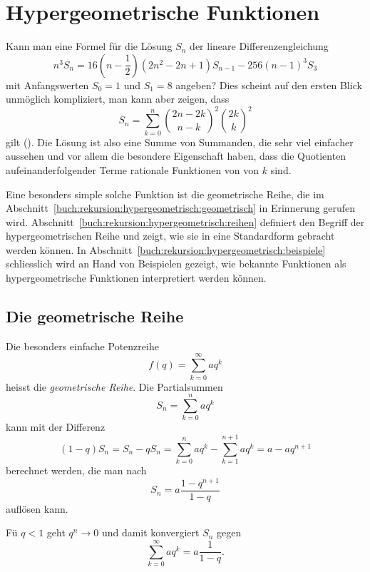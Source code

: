 %
%
%
\section{Hypergeometrische Funktionen
\label{buch:rekursion:ssection:hypergeometrische-funktion}}
Kann man eine Formel für die Lösung $S_n$ der lineare Differenzengleichung
\[
n^3S_{n}
=
16(n-{\textstyle\frac12})(2n^2-2n+1)S_{n-1}
-256(n-1)^3S_3
\]
mit Anfangswerten $S_0=1$ und $S_1=8$ angeben?
Dies scheint auf den ersten Blick unmöglich kompliziert, man kann aber
zeigen, dass
\[
S_n
=
\sum_{k=0}^n 
\binom{2n-2k}{n-k}^2 \binom{2k}{k}^2
\]
gilt (\cite[p.~xi]{buch:ab}).
Die Lösung ist also eine Summe von Summanden, die sehr viel einfacher
aussehen und vor allem die besondere Eigenschaft haben, dass die
Quotienten aufeinanderfolgender Terme rationale Funktionen von von $k$
sind.

Eine besonders simple solche Funktion ist die geometrische Reihe, die
im Abschnitt~\ref{buch:rekursion:hypergeometrisch:geometrisch}
in Erinnerung gerufen wird.
Abschnitt~\ref{buch:rekursion:hypergeometrisch:reihen}
definiert den Begriff der hypergeometrischen Reihe und zeigt, 
wie sie in eine Standardform gebracht werden können.
In Abschnitt~\ref{buch:rekursion:hypergeometrisch:beispiele}
schliesslich wird an Hand von Beispielen gezeigt, wie bekannte
Funktionen als hypergeometrische Funktionen interpretiert werden können.

\subsection{Die geometrische Reihe
\label{buch:rekursion:hypergeometrisch:geometrisch}}
Die besonders einfache Potenzreihe
\[
f(q)
=
\sum_{k=0}^\infty aq^k
\]
heisst die {\em geometrische Reihe}.
Die Partialsummen 
\[
S_n
=
\sum_{k=0}^n aq^k
\]
kann mit der Differenz
\begin{equation}
(1-q)S_n
=
S_n - qS_n
=
\sum_{k=0}^n aq^k
-
\sum_{k=1}^{n+1} aq^k
=
a -aq^{n+1}
\label{buch:rekursion:hypergeometrisch:eqn:qsumme}
\end{equation}
berechnet werden, die man nach
\begin{equation}
S_n 
=
a\frac{1-q^{n+1}}{1-q}
\label{buch:rekursion:hypergeometrisch:eqn:geomsumme}
\end{equation}
auflösen kann.

Fü $q<1$ geht $q^n\to 0$ und damit konvergiert
$S_n$  gegen
\[
\sum_{k=0}^\infty aq^k
=
a\frac{1}{1-q}.
\]

